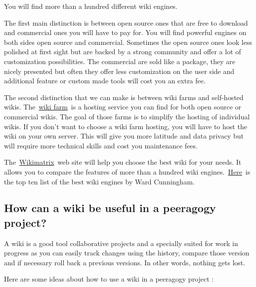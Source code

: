You will find more than a hundred different wiki engines.

The first main distinction is between open source ones that are free to
download and commercial ones you will have to pay for. You will find
powerful engines on both sides open source and commercial. Sometimes the
open source ones look less polished at first sight but are backed by a
strong community and offer a lot of customization possibilities. The
commercial are sold like a package, they are nicely presented but often
they offer less customization on the user side and additional feature or
custom made tools will cost you an extra fee.

The second distinction that we can make is between wiki farms and
self-hosted wikis.
The~\href{http://en.wikipedia.org/wiki/Wiki_hosting_service}{wiki
farm}~is a hosting service you can find for both open source or
commercial wikis. The goal of those farms is to simplify the hosting of
individual wikis. If you don't want to choose a wiki farm hosting, you
will have to host the wiki on your own server. This will give you more
latitude and data privacy but will require more technical skills and
cost you maintenance fees.

The~\href{http://www.wikimatrix.org/}{Wikimatrix}~web site will help you
choose the best wiki for your needs. It allows you to compare the
features of more than a hundred wiki
engines.~\href{http://c2.com/cgi/wiki?TopTenWikiEngines}{Here}~is the
top ten list of the best wiki engines by Ward Cunningham.

\subsection{How can a wiki be useful in a peeragogy project?}

A wiki is a good tool collaborative projects and a specially suited for
work in progress as you can easily track changes using the history,
compare those version and if necessary roll back a previous versions. In
other words, nothing gets lost.

Here are some ideas about how to use a wiki in a peeragogy project :


